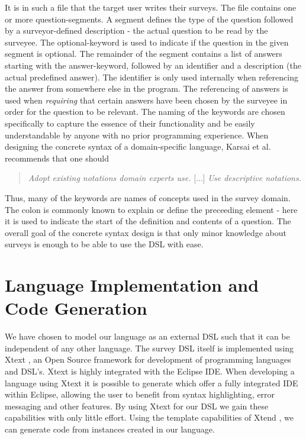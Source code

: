 \documentclass[runningheads]{llncs}
\begin{document}
\noindent
It is in such a file that the target user writes their surveys. The file contains one or more question-segments. A segment defines the type of the question followed by a surveyor-defined description - the actual question to be read by the surveyee. The \textsf{optional}-keyword is used to indicate if the question in the given segment is optional. The remainder of the segment contains a list of answers starting with the \textsf{answer}-keyword, followed by an identifier and a description (the actual predefined answer). The identifier is only used internally when referencing the answer from somewhere else in the program. The referencing of answers is used when \emph{requiring} that certain answers have been chosen by the surveyee in order for the question to be relevant. The naming of the keywords are chosen specifically to capture the essence of their functionality and be easily understandable by anyone with no prior programming experience. When designing the concrete syntax of a domain-specific language, Karsai et al. \cite{karsai} recommends that one should
\begin{quotation}
 \emph{Adopt existing notations domain experts use.} [...] \emph{Use descriptive notations.}
\end{quotation}
Thus, many of the keywords are names of concepts used in the survey domain. The colon is commonly known to explain or define the preceeding element - here it is used to indicate the start of the definition and contents of a question. The overall goal of the concrete syntax design is that only minor knowledge about surveys is enough to be able to use the DSL with ease. 

\section{Language Implementation and Code Generation}
We have chosen to model our language as an external DSL such that it can be independent of any other language. The survey DSL itself is implemented using Xtext \cite{xtext}, an Open Source framework for development of programming languages and DSL's. Xtext is highly integrated with the Eclipse IDE. When developing a language using Xtext it is possible to generate which offer a fully integrated IDE within Eclipse, allowing the user to benefit from syntax highlighting, error messaging and other features. By using Xtext for our DSL we gain these capabilities with only little effort. Using the template capabilities of Xtend \cite{xtend}, we can generate code from instances created in our language.
\end{document}

